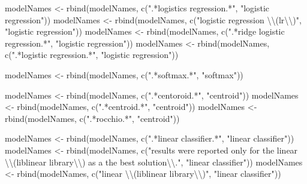 \documentclass[
]{article}
\newenvironment{Shaded}{\begin{snugshade}}{\end{snugshade}}
\newcommand{\FunctionTok}[1]{\textcolor[rgb]{0.00,0.00,0.00}{#1}}
\newcommand{\NormalTok}[1]{#1}
\newcommand{\OtherTok}[1]{\textcolor[rgb]{0.56,0.35,0.01}{#1}}
\newcommand{\SpecialCharTok}[1]{\textcolor[rgb]{0.00,0.00,0.00}{#1}}
\newcommand{\StringTok}[1]{\textcolor[rgb]{0.31,0.60,0.02}{#1}}
\begin{document}
\begin{Shaded}
\begin{Highlighting}[]
\NormalTok{modelNames }\OtherTok{\textless{}{-}} \FunctionTok{rbind}\NormalTok{(modelNames, }\FunctionTok{c}\NormalTok{(}\StringTok{".*logistics regression.*"}\NormalTok{, }\StringTok{"logistic regression"}\NormalTok{))}
\NormalTok{modelNames }\OtherTok{\textless{}{-}} \FunctionTok{rbind}\NormalTok{(modelNames, }\FunctionTok{c}\NormalTok{(}\StringTok{"logistic regression }\SpecialCharTok{\textbackslash{}\textbackslash{}}\StringTok{(lr}\SpecialCharTok{\textbackslash{}\textbackslash{}}\StringTok{)"}\NormalTok{, }\StringTok{"logistic regression"}\NormalTok{))}
\NormalTok{modelNames }\OtherTok{\textless{}{-}} \FunctionTok{rbind}\NormalTok{(modelNames, }\FunctionTok{c}\NormalTok{(}\StringTok{".*ridge logistic regression.*"}\NormalTok{, }\StringTok{"logistic regression"}\NormalTok{))}
\NormalTok{modelNames }\OtherTok{\textless{}{-}} \FunctionTok{rbind}\NormalTok{(modelNames, }\FunctionTok{c}\NormalTok{(}\StringTok{".*logistic regression.*"}\NormalTok{, }\StringTok{"logistic regression"}\NormalTok{))}

\NormalTok{modelNames }\OtherTok{\textless{}{-}} \FunctionTok{rbind}\NormalTok{(modelNames, }\FunctionTok{c}\NormalTok{(}\StringTok{".*softmax.*"}\NormalTok{, }\StringTok{"softmax"}\NormalTok{))}

\NormalTok{modelNames }\OtherTok{\textless{}{-}} \FunctionTok{rbind}\NormalTok{(modelNames, }\FunctionTok{c}\NormalTok{(}\StringTok{".*centoroid.*"}\NormalTok{, }\StringTok{"centroid"}\NormalTok{))}
\NormalTok{modelNames }\OtherTok{\textless{}{-}} \FunctionTok{rbind}\NormalTok{(modelNames, }\FunctionTok{c}\NormalTok{(}\StringTok{".*centroid.*"}\NormalTok{, }\StringTok{"centroid"}\NormalTok{))}
\NormalTok{modelNames }\OtherTok{\textless{}{-}} \FunctionTok{rbind}\NormalTok{(modelNames, }\FunctionTok{c}\NormalTok{(}\StringTok{".*rocchio.*"}\NormalTok{, }\StringTok{"centroid"}\NormalTok{))}

\NormalTok{modelNames }\OtherTok{\textless{}{-}} \FunctionTok{rbind}\NormalTok{(modelNames, }\FunctionTok{c}\NormalTok{(}\StringTok{".*linear classifier.*"}\NormalTok{, }\StringTok{"linear classifier"}\NormalTok{))}
\NormalTok{modelNames }\OtherTok{\textless{}{-}} \FunctionTok{rbind}\NormalTok{(modelNames, }\FunctionTok{c}\NormalTok{(}\StringTok{"results were reported only for the linear }\SpecialCharTok{\textbackslash{}\textbackslash{}}\StringTok{(liblinear library}\SpecialCharTok{\textbackslash{}\textbackslash{}}\StringTok{) as a the best solution}\SpecialCharTok{\textbackslash{}\textbackslash{}}\StringTok{."}\NormalTok{, }\StringTok{"linear classifier"}\NormalTok{))}
\NormalTok{modelNames }\OtherTok{\textless{}{-}} \FunctionTok{rbind}\NormalTok{(modelNames, }\FunctionTok{c}\NormalTok{(}\StringTok{"linear }\SpecialCharTok{\textbackslash{}\textbackslash{}}\StringTok{(liblinear library}\SpecialCharTok{\textbackslash{}\textbackslash{}}\StringTok{)"}\NormalTok{, }\StringTok{"linear classifier"}\NormalTok{))}


\end{Highlighting}
\end{Shaded}
\end{document}
